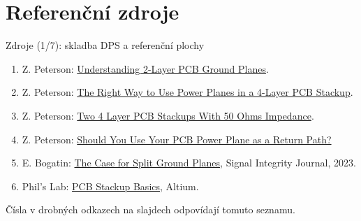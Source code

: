 \documentclass{beamer}
\begin{document}
\section{\texorpdfstring{Referenční zdroje}{Referencni zdroje}}
\begin{frame}[t]{Zdroje (1/7): skladba DPS a referenční plochy}
	\small
	\begin{enumerate}
		\item Z. Peterson: \href{https://resources.altium.com/p/understanding-ground-planes-your-two-layer-pcb}{Understanding 2-Layer PCB Ground Planes}.
		\item Z. Peterson: \href{https://resources.altium.com/p/right-way-use-power-planes-4-layer-pcb-stackup}{The Right Way to Use Power Planes in a 4-Layer PCB Stackup}.
		\item Z. Peterson: \href{https://resources.altium.com/p/two-alternative-4-layer-pcb-stackups-50-ohms-impedance}{Two 4 Layer PCB Stackups With 50 Ohms Impedance}.
		\item Z. Peterson: \href{https://resources.altium.com/p/should-you-use-your-power-plane-as-a-return-path}{Should You Use Your PCB Power Plane as a Return Path?}
		\item E. Bogatin: \href{https://www.signalintegrityjournal.com/articles/2982-the-case-for-split-ground-planes}{The Case for Split Ground Planes}, Signal Integrity Journal, 2023.
		\item Phil's Lab: \href{https://resources.altium.com/p/pcb-stackup-basics}{PCB Stackup Basics}, Altium.
	\end{enumerate}
	\medskip
	{\scriptsize Čísla v drobných odkazech na slajdech odpovídají tomuto seznamu.}
\end{frame}
\end{document}
